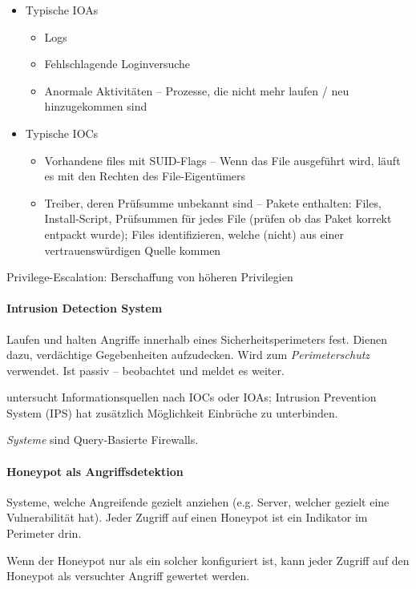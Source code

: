 \documentclass[a4paper,12pt]{article}
\begin{document}
\begin{itemize}
\item Typische IOAs
    \begin{itemize}
    \item Logs
    \item Fehlschlagende Loginversuche
    \item Anormale Aktivitäten -- Prozesse, die nicht mehr laufen / neu hinzugekommen sind
    \end{itemize}
\item Typische IOCs
    \begin{itemize}
    \item Vorhandene files mit SUID-Flags -- Wenn das File ausgeführt wird, läuft es mit den Rechten des File-Eigentümers
    \item Treiber, deren Prüfsumme unbekannt sind -- Pakete enthalten: Files, Install-Script, Prüfsummen für jedes File (prüfen ob das Paket korrekt entpackt wurde); Files identifizieren, welche (nicht) aus einer vertrauenswürdigen Quelle kommen
    \end{itemize}
\end{itemize}

Privilege-Escalation: Berschaffung von höheren Privilegien

\paragraph{Intrusion Detection System}
Laufen und halten Angriffe innerhalb eines Sicherheitsperimeters fest. Dienen dazu, verdächtige Gegebenheiten aufzudecken. Wird zum \emph{Perimeterschutz} verwendet. Ist passiv -- beobachtet und meldet es weiter.

untersucht Informationsquellen nach IOCs oder IOAs; Intrusion Prevention System (IPS) hat zusätzlich Möglichkeit Einbrüche zu unterbinden.

\emph{Systeme} sind Query-Basierte Firewalls.

\paragraph{Honeypot als Angriffsdetektion}
Systeme, welche Angreifende gezielt anziehen (e.g. Server, welcher gezielt eine Vulnerabilität hat). Jeder Zugriff auf einen Honeypot ist ein Indikator im Perimeter drin.

Wenn der Honeypot nur als ein solcher konfiguriert ist, kann jeder Zugriff auf den Honeypot als versuchter Angriff gewertet werden.
\end{document}
